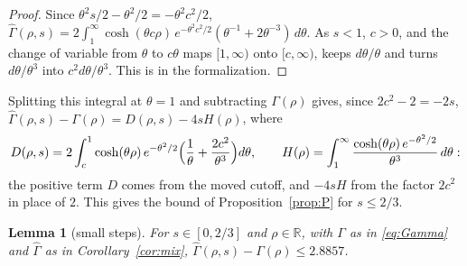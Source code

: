 \documentclass[12pt]{amsart}
\newtheorem{lemma}[theorem]{Lemma}
\theoremstyle{definition}
\numberwithin{equation}{section}
\newcommand{\R}{\mathbb{R}}
\newcommand{\Ghat}{\widehat{\Gamma}}
\newcommand{\leanmap}[1]{\ignorespaces}
\newcommand{\mapnote}[1]{\ignorespaces}
\begin{document}
\begin{proof}
Since $\theta^2s/2-\theta^2/2=-\theta^2c^2/2$, $\Ghat(\rho,s)=2\int_1^\infty\cosh(\theta c\rho)\,e^{-\theta^2c^2/2}(\theta^{-1}+2\theta^{-3})\,d\theta$. As $s<1$, $c>0$, and the change of variable from $\theta$ to $c\theta$ maps $[1,\infty)$ onto $[c,\infty)$, keeps $d\theta/\theta$ and turns $d\theta/\theta^3$ into $c^2d\theta/\theta^3$. This is  in the formalization.
\end{proof}

Splitting this integral at $\theta=1$ and subtracting $\Gamma(\rho)$ gives, since $2c^2-2=-2s$, $\Ghat(\rho,s)-\Gamma(\rho)=D(\rho,s)-4sH(\rho)$, where
\[
D(\rho,s)=2\int_c^1\cosh(\theta\rho)\,e^{-\theta^2/2}\Bigl(\frac1\theta+\frac{2c^2}{\theta^3}\Bigr)d\theta,\qquad H(\rho)=\int_1^\infty\frac{\cosh(\theta\rho)\,e^{-\theta^2/2}}{\theta^3}\,d\theta:
\]
the positive term $D$ comes from the moved cutoff, and $-4sH$ from the factor $2c^2$ in place of $2$. This gives the bound of Proposition~\ref{prop:P} for $s\le2/3$.

\begin{lemma}[small steps]\label{lem:small}
\leanmap{RegretKappa.UpperSharp.small_step_sharp, RegretKappa.UpperSharp.quartic_le}
\mapnote{Lean proves it in the normalization $\Gamma/2$ ($2.8857/2$), with the maximum of $f$ bounded by $4.32855$ from rational coefficients, and without expanding $\cosh$ in a series, from polynomial bounds on $\cosh$ with a remainder, which lead to the same quartic $f$.}
For $s\in[0,2/3]$ and $\rho\in\R$, with $\Gamma$ as in \eqref{eq:Gamma} and $\Ghat$ as in Corollary~\ref{cor:mix}, $\Ghat(\rho,s)-\Gamma(\rho)\le2.8857$.
\end{lemma}
\end{document}
